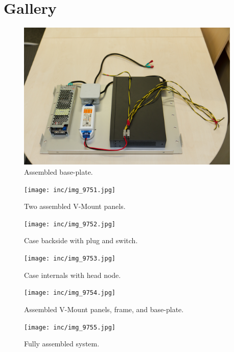 \chapter{Gallery}

\begin{figure}
	\includegraphics[width=0.95\textwidth]{inc/img_9750.jpg}
	\caption{Assembled base-plate.}
\end{figure}

\begin{figure}
	\texttt{[image: inc/img\_9751.jpg]}
	\caption{Two assembled V-Mount panels.}
\end{figure}

\begin{figure}
	\texttt{[image: inc/img\_9752.jpg]}
	\caption{Case backside with plug and switch.}
\end{figure}

\begin{figure}
	\texttt{[image: inc/img\_9753.jpg]}
	\caption{Case internals with head node.}
\end{figure}

\begin{figure}
	\texttt{[image: inc/img\_9754.jpg]}
	\caption{Assembled V-Mount panels, frame, and base-plate.}
\end{figure}

\begin{figure}
	\texttt{[image: inc/img\_9755.jpg]}
	\caption{Fully assembled system.}
\end{figure}
